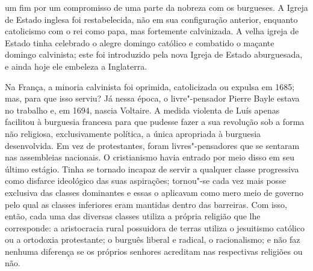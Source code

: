 um fim por um compromisso de uma parte da nobreza com os burgueses. A Igreja de Estado
inglesa foi restabelecida, não em sua configuração anterior, enquanto
catolicismo com o rei como papa, mas fortemente calvinizada. A velha
igreja de Estado tinha celebrado o alegre domingo católico e combatido o
maçante domingo calvinista; este foi introduzido pela nova Igreja de
Estado aburguesada, e ainda hoje ele embeleza a Inglaterra.

Na França, a minoria calvinista foi oprimida, catolicizada ou expulsa em
1685; mas, para que isso serviu? Já nessa época, o
livre"-pensador Pierre
Bayle estava no trabalho e, em 1694,
nascia Voltaire.
A medida violenta
de Luís  apenas facilitou à burguesia francesa para que pudesse fazer a sua %
revolução sob a forma não religiosa, exclusivamente política, a única
apropriada à burguesia desenvolvida. Em vez de protestantes, foram
livres"-pensadores que se sentaram nas assembleias nacionais. O
cristianismo havia entrado por meio disso em seu último estágio. Tinha
se tornado incapaz de servir a qualquer classe progressiva como disfarce
ideológico das suas aspirações; tornou"-se cada vez mais posse exclusiva
das classes dominantes e essas o aplicavam como mero meio de governo
pelo qual as classes inferiores eram mantidas dentro das barreiras. Com
isso, então, cada uma das diversas classes utiliza a própria religião
que lhe corresponde: a aristocracia rural possuidora de 
terras utiliza o jesuitismo católico ou a ortodoxia protestante; o
burguês liberal e radical, o racionalismo; e não faz nenhuma diferença
se os próprios senhores acreditam nas respectivas religiões ou não.

